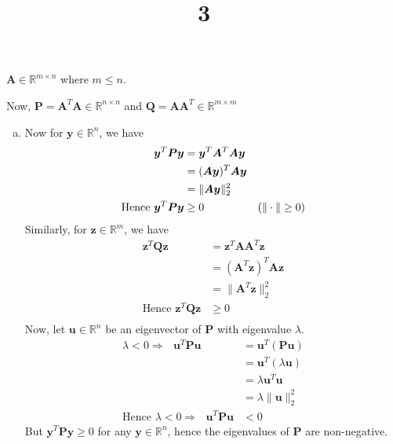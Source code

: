 \documentclass[a4paper]{article}
\title{3}
\date{}
\begin{document}
\maketitle
$\bm{A}\in\mathbb{R}^{m \times n}$ where $m \leq n$.

Now, $\bm{P}=\bm{A}^T\bm{A}\in\mathbb{R}^{n \times n}$ and $\bm{Q}=\bm{A}\bm{A}^T\in\mathbb{R}^{m \times m}$
\begin{enumerate}[(a)]
	\item Now for $\bm{y}\in\mathbb{R}^n$, we have {\label{itm:a}}
	\begin{equation}
		\begin{aligned}
			\bm{y}^T\bm{P}\bm{y}
			&=\bm{y}^T\bm{A}^T\bm{A}\bm{y}\\
			&=(\bm{A}\bm{y})^T\bm{A}\bm{y}\\
			&=\|\bm{A}\bm{y}\|_2^2\\
			\text{Hence } \bm{y}^T\bm{P}\bm{y}&\geq0&\hfill{(\text{$\|\cdot\| \geq 0$})}\\
		\end{aligned}
	\end{equation}
	Similarly, for $\bm{z}\in\mathbb{R}^m$, we have 
	\begin{equation}
		\begin{aligned}
			\bm{z}^T\bm{Q}\bm{z}
			&=\bm{z}^T\bm{A}\bm{A}^T\bm{z}\\
			&=(\bm{A}^T\bm{z})^T\bm{A}\bm{z}\\
			&=\|\bm{A}^T\bm{z}\|_2^2\\
			\text{Hence } \bm{z}^T\bm{Q}\bm{z}&\geq0\\
		\end{aligned}
	\end{equation}
	Now, let $\bm{u}\in\mathbb{R}^n$ be an eigenvector of $\bm{P}$ with eigenvalue $\lambda$.
	\begin{equation}
		\begin{aligned}
			\text{$\lambda<0\Rightarrow$ } \bm{u}^T\bm{P}\bm{u}
			&=\bm{u}^T(\bm{P}\bm{u})\\
			&=\bm{u}^T(\lambda\bm{u})\\
			&=\lambda\bm{u}^T\bm{u}\\
			&=\lambda\|\bm{u}\|_2^2\\
			\text{Hence $\lambda<0\Rightarrow$ } \bm{u}^T\bm{P}\bm{u}&<0
		\end{aligned}
	\end{equation}
	But $\bm{y}^T\bm{P}\bm{y}\geq0$ for any $\bm{y}\in\mathbb{R}^n$, hence the eigenvalues of $\bm{P}$ are non-negative.


\end{enumerate}
\end{document}
